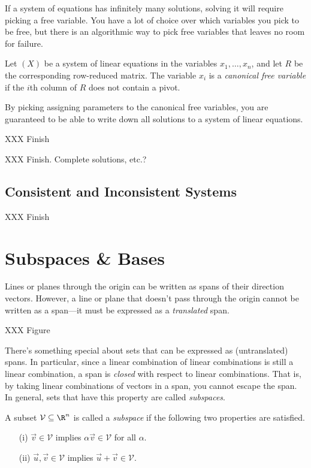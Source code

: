 If a system of equations has infinitely many solutions, solving it will
require picking a free variable. You have a lot of choice over which variables
you pick to be free, but there is an algorithmic way to pick free variables that leaves
no room for failure.
\begin{definition}
	Let $(X)$ be a system of linear equations in the variables
	$x_1,\ldots, x_n$, and let $R$ be the corresponding
	row-reduced matrix. The variable $x_i$ is a \emph{canonical
	free variable} if the $i$th column of $R$ does not contain a pivot.
\end{definition}
By picking assigning parameters to the canonical free variables, you are guaranteed
to be able to write down all solutions to a system of linear equations.

\begin{example}
	XXX Finish
\end{example}

XXX Finish. Complete solutions, etc.?

\subsection{Consistent and Inconsistent Systems}

XXX Finish


\section{Subspaces \& Bases}

	Lines or planes through the origin can be written as spans
	of their direction vectors. However, a line or plane that doesn't
	pass through the origin cannot be written as a span---it must
	be expressed as a \emph{translated} span.

	XXX Figure


	There's something special about sets that can be expressed as 
	(untranslated) spans. In particular, since a linear combination
	of linear combinations is still a linear combination, a span
	is \emph{closed} with respect to linear combinations. That is, 
	by taking linear combinations of vectors in a span, you cannot
	escape the span. In general, sets that have this property are called
	\emph{subspaces}.

	\begin{definition}[Subspace]
		A subset $\mathcal V\subseteq \R^n$ is called a \emph{subspace}
		if the following two properties are satisfied.
		\begin{enumerate}
			\item[(i)] $\vec v\in\mathcal V$ implies $\alpha\vec v\in\mathcal V$
			for all $\alpha$.
			\item[(ii)] $\vec u,\vec v\in \mathcal V$ implies $\vec u+\vec v\in\mathcal V$.
		\end{enumerate}
	\end{definition}

